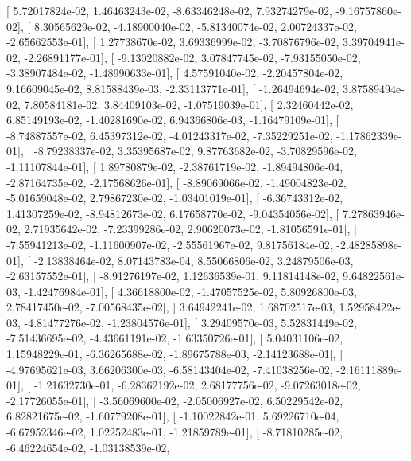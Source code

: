 \documentclass{article}
\begin{document}
       [  5.72017824e-02,   1.46463243e-02,  -8.63346248e-02,
          7.93274279e-02,  -9.16757860e-02],
       [  8.30565629e-02,  -4.18900040e-02,  -5.81340074e-02,
          2.00724337e-02,  -2.65662553e-01],
       [  1.27738670e-02,   3.69336999e-02,  -3.70876796e-02,
          3.39704941e-02,  -2.26891177e-01],
       [ -9.13020882e-02,   3.07847745e-02,  -7.93155050e-02,
         -3.38907484e-02,  -1.48990633e-01],
       [  4.57591040e-02,  -2.20457804e-02,   9.16609045e-02,
          8.81588439e-03,  -2.33113771e-01],
       [ -1.26494694e-02,   3.87589494e-02,   7.80584181e-02,
          3.84409103e-02,  -1.07519039e-01],
       [  2.32460442e-02,   6.85149193e-02,  -1.40281690e-02,
          6.94366806e-03,  -1.16479109e-01],
       [ -8.74887557e-02,   6.45397312e-02,  -4.01243317e-02,
         -7.35229251e-02,  -1.17862339e-01],
       [ -8.79238337e-02,   3.35395687e-02,   9.87763682e-02,
         -3.70829596e-02,  -1.11107844e-01],
       [  1.89780879e-02,  -2.38761719e-02,  -1.89494806e-04,
         -2.87164735e-02,  -2.17568626e-01],
       [ -8.89069066e-02,  -1.49004823e-02,  -5.01659048e-02,
          2.79867230e-02,  -1.03401019e-01],
       [ -6.36743312e-02,   1.41307259e-02,  -8.94812673e-02,
          6.17658770e-02,  -9.04354056e-02],
       [  7.27863946e-02,   2.71935642e-02,  -7.23399286e-02,
          2.90620073e-02,  -1.81056591e-01],
       [ -7.55941213e-02,  -1.11600907e-02,  -2.55561967e-02,
          9.81756184e-02,  -2.48285898e-01],
       [ -2.13838464e-02,   8.07143783e-04,   8.55066806e-02,
          3.24879506e-03,  -2.63157552e-01],
       [ -8.91276197e-02,   1.12636539e-01,   9.11814148e-02,
          9.64822561e-03,  -1.42476984e-01],
       [  4.36618800e-02,  -1.47057525e-02,   5.80926800e-03,
          2.78417450e-02,  -7.00568435e-02],
       [  3.64942241e-02,   1.68702517e-03,   1.52958422e-03,
         -4.81477276e-02,  -1.23804576e-01],
       [  3.29409570e-03,   5.52831449e-02,  -7.51436695e-02,
         -4.43661191e-02,  -1.63350726e-01],
       [  5.04031106e-02,   1.15948229e-01,  -6.36265688e-02,
         -1.89675788e-03,  -2.14123688e-01],
       [ -4.97695621e-03,   3.66206300e-03,  -6.58143404e-02,
         -7.41038256e-02,  -2.16111889e-01],
       [ -1.21632730e-01,  -6.28362192e-02,   2.68177756e-02,
         -9.07263018e-02,  -2.17726055e-01],
       [ -3.56069600e-02,  -2.05006927e-02,   6.50229542e-02,
          6.82821675e-02,  -1.60779208e-01],
       [ -1.10022842e-01,   5.69226710e-04,  -6.67952346e-02,
          1.02252483e-01,  -1.21859789e-01],
       [ -8.71810285e-02,  -6.46224654e-02,  -1.03138539e-02,
\end{document}
